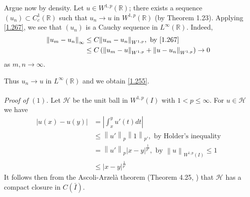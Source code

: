 \documentclass[a4paper,oneside]{article}
\numberwithin{equation}{section}
\begin{document}
Argue now by density. Let $u\in W^{1,p}\left(\mathbb{R}\right)$; there exists a sequence $\left(u_n\right)\subset C_c^1\left(\mathbb{R}\right)$ such that $u_n\to u$ in $W^{1,p}\left(\mathbb{R}\right)$ (by Theorem 1.23). Applying \eqref{1.267}, we see that $\left(u_n\right)$ is a Cauchy sequence in $L^{\infty}\left(\mathbb{R}\right)$. Indeed, 
\begin{align}
{\left\| {{u_m} - {u_n}} \right\|_\infty } &\le C{\left\| {{u_m} - {u_n}} \right\|_{{W^{1,p}}}},\mbox{ by \eqref{1.267}}\\
 &\le C\left( {{{\left\| {{u_m} - u} \right\|}_{{W^{1,p}}}} + {{\left\| {u - {u_n}} \right\|}_{{W^{1,p}}}}} \right) \to 0
\end{align}
as $m,n\to \infty$.

Thus $u_n\to u$ in $L^{\infty}\left(\mathbb{R}\right)$ and we obtain \eqref{1.255}.\\
\\
\textit{Proof of $\left(1\right)$.} Let $\mathcal{H}$ be the unit ball in $W^{1,p}\left(I\right)$ with $1<p\le \infty$. For $u\in \mathcal{H}$ we have
\begin{align}
\label{1.293}
\left| {u\left( x \right) - u\left( y \right)} \right| &= \left| {\int_x^y {u'\left( t \right)dt} } \right|\\
 &\le {\left\| {u'} \right\|_p}{\left\| 1 \right\|_{p'}},\mbox{ by Holder's inequality}\\
 &= {\left\| {u'} \right\|_p}{\left| {x - y} \right|^{\frac{1}{{p'}}}},\mbox{ by }{\left\| u \right\|_{{W^{1,p}}\left( I \right)}} \le 1\\
& \le {\left| {x - y} \right|^{\frac{1}{{p'}}}} \label{1.296}
\end{align}
It follows then from the Ascoli-Arzel\`{a} theorem (Theorem 4.25, \cite{1}) that $\mathcal{H}$ has a compact closure in $C\left(\bar{I}\right)$. 
\end{document}
